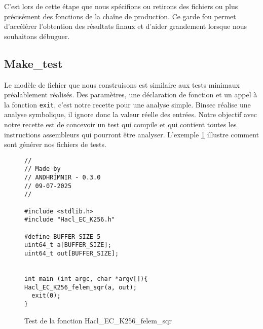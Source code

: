 C'est lors de cette étape que nous spécifions ou retirons des fichiers ou plus précisément des fonctions de la chaîne de production. Ce garde fou permet d'accélérer l'obtention des résultats finaux et d'aider grandement lorsque nous souhaitons débuguer.

\subsection*{Make\_test}

Le modèle de fichier que nous construisons est similaire aux tests minimaux préalablement réalisés. Des paramètres, une déclaration de fonction et un appel à la fonction \texttt{exit}, c'est notre recette pour une analyse simple. Binsec réalise une analyse symbolique, il ignore donc la valeur réelle des entrées. Notre objectif avec notre recette est de concevoir un test qui compile et qui contient toutes les instructions assembleurs qui pourront être analyser. L'exemple \ref{fig:gen_test_simple} illustre comment sont générer nos fichiers de tests.\medbreak

\begin{figure}[!ht]
  \caption{Test de la fonction Hacl\_EC\_K256\_felem\_sqr}
  \label{fig:gen_test_simple}
  \begin{verbatim}
//
// Made by
// ANDHRÍMNIR - 0.3.0
// 09-07-2025
//

#include <stdlib.h>
#include "Hacl_EC_K256.h"

#define BUFFER_SIZE 5
uint64_t a[BUFFER_SIZE];
uint64_t out[BUFFER_SIZE];


int main (int argc, char *argv[]){
Hacl_EC_K256_felem_sqr(a, out);
  exit(0);
}   
  \end{verbatim}

\end{figure}

